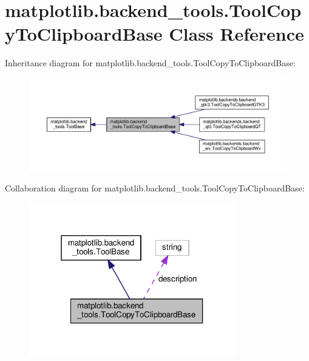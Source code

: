 \hypertarget{classmatplotlib_1_1backend__tools_1_1ToolCopyToClipboardBase}{}\section{matplotlib.\+backend\+\_\+tools.\+Tool\+Copy\+To\+Clipboard\+Base Class Reference}
\label{classmatplotlib_1_1backend__tools_1_1ToolCopyToClipboardBase}


Inheritance diagram for matplotlib.\+backend\+\_\+tools.\+Tool\+Copy\+To\+Clipboard\+Base\+:
\nopagebreak
\begin{figure}[H]
\begin{center}
\leavevmode
\includegraphics[width=350pt]{classmatplotlib_1_1backend__tools_1_1ToolCopyToClipboardBase__inherit__graph}
\end{center}
\end{figure}


Collaboration diagram for matplotlib.\+backend\+\_\+tools.\+Tool\+Copy\+To\+Clipboard\+Base\+:
\nopagebreak
\begin{figure}[H]
\begin{center}
\leavevmode
\includegraphics[width=255pt]{classmatplotlib_1_1backend__tools_1_1ToolCopyToClipboardBase__coll__graph}
\end{center}
\end{figure}
